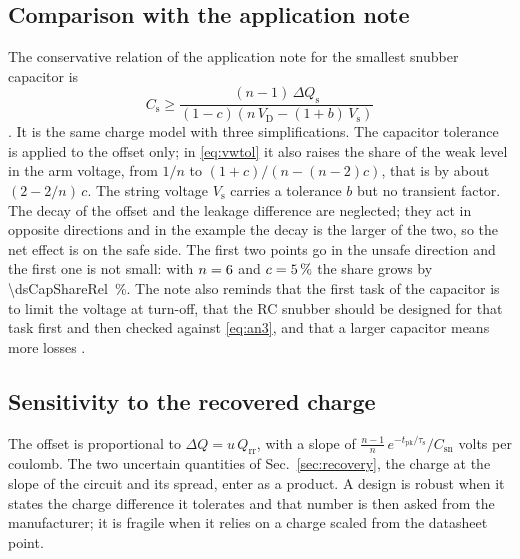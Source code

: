 \documentclass[10pt,a4paper]{scrartcl}
\newcommand{\Qrr}{Q_\mathrm{rr}}
\newcommand{\Csn}{C_\mathrm{sn}}
\newcommand{\taus}{\tau_\mathrm{s}}
\begin{document}
\subsection{Comparison with the application note}
The conservative relation of the application note for the smallest snubber capacitor is
\begin{equation}
C_\mathrm{s} \ge \frac{(n-1)\,\Delta Q_\mathrm{s}}{(1-c)\left(n\,V_\mathrm{D} - (1+b)\,V_\mathrm{s}\right)}
\label{eq:an3}
\end{equation}
\cite[Eq.~(3)]{an6531}. It is the same charge model with three simplifications. The capacitor tolerance is applied to the offset only; in \eqref{eq:vwtol} it also raises the share of the weak level in the arm voltage, from $1/n$ to $(1+c)/(n - (n-2)c)$, that is by about $(2 - 2/n)\,c$. The string voltage $V_\mathrm{s}$ carries a tolerance $b$ but no transient factor. The decay of the offset and the leakage difference are neglected; they act in opposite directions and in the example the decay is the larger of the two, so the net effect is on the safe side. The first two points go in the unsafe direction and the first one is not small: with $n = 6$ and $c = \SI{5}{\percent}$ the share grows by \SI{\dsCapShareRel}{\percent}. The note also reminds that the first task of the capacitor is to limit the voltage at turn-off, that the RC snubber should be designed for that task first and then checked against \eqref{eq:an3}, and that a larger capacitor means more losses \cite[Sec.~2.2.3]{an6531}.

\subsection{Sensitivity to the recovered charge}
The offset is proportional to $\Delta Q = u\,\Qrr$, with a slope of $\tfrac{n-1}{n}\,e^{-t_\mathrm{pk}/\taus}/\Csn$ volts per coulomb. The two uncertain quantities of Sec.~\ref{sec:recovery}, the charge at the slope of the circuit and its spread, enter as a product. A design is robust when it states the charge difference it tolerates and that number is then asked from the manufacturer; it is fragile when it relies on a charge scaled from the datasheet point.
\end{document}
